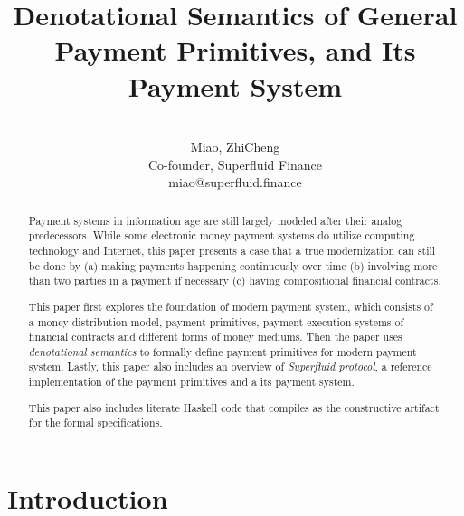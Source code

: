 




\title{Denotational Semantics of General Payment Primitives, and Its Payment System}

\author{\\
    Miao, ZhiCheng\\
    Co-founder, Superfluid Finance\\
    miao@superfluid.finance
}


\maketitle

\begin{abstract}
Payment systems in information age are still largely modeled after their analog predecessors. While
some electronic money payment systems do utilize computing technology and Internet, this paper
presents a case that a true modernization can still be done by (a) making payments happening
continuously over time (b) involving more than two parties in a payment if necessary (c) having
compositional financial contracts.

This paper first explores the foundation of modern payment system, which consists of a money
distribution model, payment primitives, payment execution systems of financial contracts and
different forms of money mediums. Then the paper uses \textit{denotational semantics} to formally
define payment primitives for modern payment system. Lastly, this paper also includes an overview
of \textit{Superfluid protocol}, a reference implementation of the payment primitives and a its
payment system.

This paper also includes literate Haskell code that compiles as the constructive artifact for the
formal specifications.

\end{abstract}

\chapter{Introduction}

